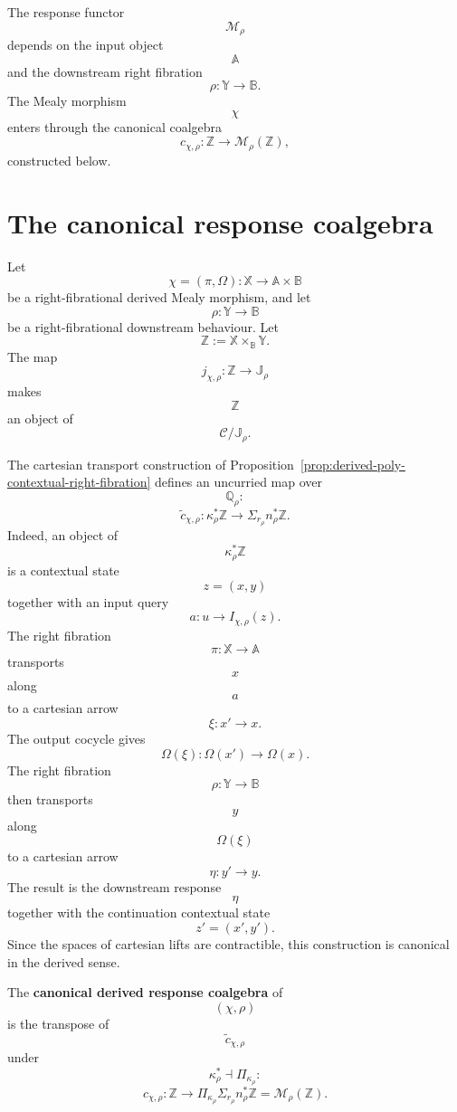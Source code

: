 \begin{remark}[Dependence]
\label{rem:derived-poly-response-functor-dependence}
The response functor
\[
\mathcal M_\rho
\]
depends on the input object
\[
\mathbb A
\]
and the downstream right fibration
\[
\rho:\mathbb Y\to\mathbb B.
\]
The Mealy morphism
\[
\chi
\]
enters through the canonical coalgebra
\[
c_{\chi,\rho}:\mathbb Z\to\mathcal M_\rho(\mathbb Z),
\]
constructed below.
\end{remark}

\section{The canonical response coalgebra}
\label{sec:derived-poly-canonical-response-coalgebra}

Let
\[
\chi=(\pi,\Omega):\mathbb X\to\mathbb A\times\mathbb B
\]
be a right-fibrational derived Mealy morphism, and let
\[
\rho:\mathbb Y\to\mathbb B
\]
be a right-fibrational downstream behaviour.  Let
\[
\mathbb Z:=\mathbb X\times_{\mathbb B}\mathbb Y.
\]
The map
\[
j_{\chi,\rho}:\mathbb Z\to\mathbb J_\rho
\]
makes
\[
\mathbb Z
\]
an object of
\[
\mathcal C/\mathbb J_\rho.
\]

The cartesian transport construction of
Proposition~\ref{prop:derived-poly-contextual-right-fibration} defines an
uncurried map over
\[
\mathbb Q_\rho:
\]
\[
\widetilde c_{\chi,\rho}:
\kappa_\rho^\ast\mathbb Z
\longrightarrow
\Sigma_{r_\rho}n_\rho^\ast\mathbb Z.
\]
Indeed, an object of
\[
\kappa_\rho^\ast\mathbb Z
\]
is a contextual state
\[
z=(x,y)
\]
together with an input query
\[
a:u\to I_{\chi,\rho}(z).
\]
The right fibration
\[
\pi:\mathbb X\to\mathbb A
\]
transports
\[
x
\]
along
\[
a
\]
to a cartesian arrow
\[
\xi:x'\to x.
\]
The output cocycle gives
\[
\Omega(\xi):\Omega(x')\to\Omega(x).
\]
The right fibration
\[
\rho:\mathbb Y\to\mathbb B
\]
then transports
\[
y
\]
along
\[
\Omega(\xi)
\]
to a cartesian arrow
\[
\eta:y'\to y.
\]
The result is the downstream response
\[
\eta
\]
together with the continuation contextual state
\[
z'=(x',y').
\]
Since the spaces of cartesian lifts are contractible, this construction is
canonical in the derived sense.

\begin{definition}
\label{def:derived-poly-canonical-response-coalgebra}
The \textbf{canonical derived response coalgebra} of
\[
(\chi,\rho)
\]
is the transpose of
\[
\widetilde c_{\chi,\rho}
\]
under
\[
\kappa_\rho^\ast\dashv\Pi_{\kappa_\rho}:
\]
\[
c_{\chi,\rho}:
\mathbb Z
\longrightarrow
\Pi_{\kappa_\rho}\Sigma_{r_\rho}n_\rho^\ast\mathbb Z
=
\mathcal M_\rho(\mathbb Z).
\]
\end{definition}

